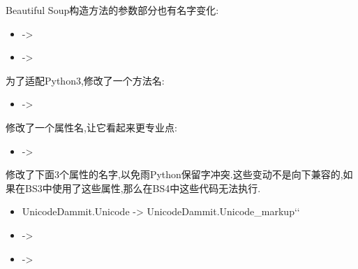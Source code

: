 \documentclass[letterpaper,12pt,english]{sphinxmanual}
\begin{document}
Beautiful Soup构造方法的参数部分也有名字变化:
\begin{itemize}
\item {} 
 -\textgreater{} 

\item {} 
 -\textgreater{} 

\end{itemize}

为了适配Python3,修改了一个方法名:
\begin{itemize}
\item {} 
 -\textgreater{} 

\end{itemize}

修改了一个属性名,让它看起来更专业点:
\begin{itemize}
\item {} 
 -\textgreater{} 

\end{itemize}

修改了下面3个属性的名字,以免雨Python保留字冲突.这些变动不是向下兼容的,如果在BS3中使用了这些属性,那么在BS4中这些代码无法执行.
\begin{itemize}
\item {} 
UnicodeDammit.Unicode -\textgreater{} UnicodeDammit.Unicode\_markup{}`{}`

\item {} 
 -\textgreater{} 

\item {} 
 -\textgreater{} 

\end{itemize}
\end{document}
